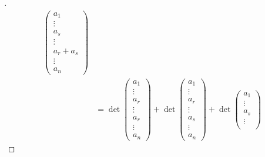 \begin{proof}[]
\begin{align*}
\begin{pmatrix}
                                                        a_1       \\
                                                        \vdots    \\
                                                        a_s       \\
                                                        \vdots    \\
                                                        a_r + a_s \\
                                                        \vdots    \\
                                                        a_n
                                                      \end{pmatrix}                     \\
      & = \det\begin{pmatrix}
                a_1    \\
                \vdots \\
                a_r    \\
                \vdots \\
                a_r    \\
                \vdots \\
                a_n
              \end{pmatrix} + \det\begin{pmatrix}
                                    a_1    \\
                                    \vdots \\
                                    a_r    \\
                                    \vdots \\
                                    a_s    \\
                                    \vdots \\
                                    a_n
                                  \end{pmatrix} + \det\begin{pmatrix}
                                                        a_1    \\
                                                        \vdots \\
                                                        a_s    \\
                                                        \vdots \\

\end{pmatrix}
\end{align*}
\end{proof}
